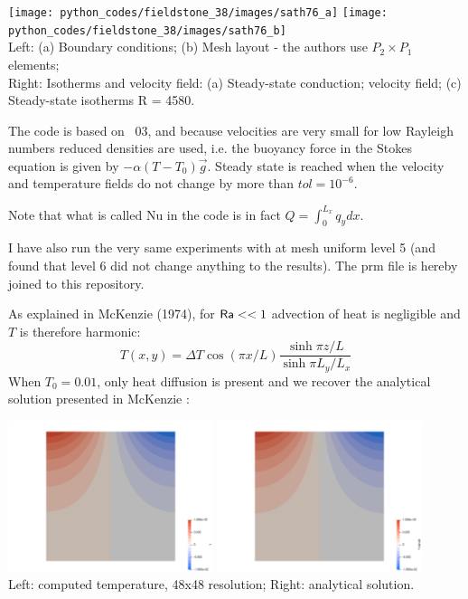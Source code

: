 \begin{center}
\texttt{[image: python\_codes/fieldstone\_38/images/sath76\_a]}
\texttt{[image: python\_codes/fieldstone\_38/images/sath76\_b]}\\
{\captionfont Left: (a) Boundary conditions; (b) Mesh layout - the authors
use $P_2\times P_1$ elements;\\
Right: Isotherms and velocity field: (a) Steady-state conduction;
velocity field; (c) Steady-state isotherms R = 4580.}
\end{center}

The code is based on \stone~03, and because velocities are very small for low Rayleigh numbers
reduced densities are used, i.e. the buoyancy force in the Stokes equation is given by $-\alpha(T-T_0)\vec{g}$.
Steady state is reached when the velocity and temperature fields do not change by more than $tol=10^{-6}$.

Note that what is called Nu in the code is in fact $Q=\int_0^{L_x} q_y dx$.

I have also run the very same experiments with \aspect{} at mesh uniform level 5 (and found that 
level 6 did not change anything to the results). The prm file is hereby joined to this repository.

As explained in McKenzie \etal (1974), for ${\mathsf{Ra}} <<1$ advection of heat is negligible and $T$ is therefore harmonic:
\[
T(x,y) = \Delta T \cos (\pi x/L) \frac{\sinh \pi z/L}{\sinh \pi L_y/L_x}
\]
When $T_0=0.01$, only heat diffusion is present and we recover the analytical solution presented in McKenzie \etal:

\begin{center}
\includegraphics[width=6cm]{python_codes/fieldstone_38/results/T0_0p001_32x32/T}
\includegraphics[width=6cm]{python_codes/fieldstone_38/results/T0_0p001_32x32/T_anal}\\
{\captionfont Left: computed temperature, 48x48 resolution; Right: analytical solution.}
\end{center}

